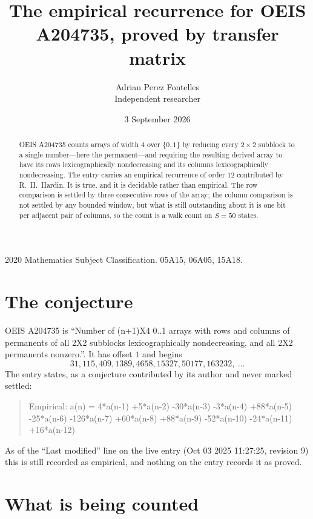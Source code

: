 \documentclass[11pt,a4paper]{article}
\title{The empirical recurrence for OEIS A204735, proved by transfer matrix}
\author{Adrian Perez Fontelles\\ \small Independent researcher}
\date{3 September 2026}
\theoremstyle{plain}
\theoremstyle{definition}
\begin{document}
\maketitle

\begin{abstract}
OEIS A204735 counts arrays of width $4$ over $\{0,1\}$ by reducing every $2\times2$ subblock to a
single number---here the permanent---and requiring the resulting derived array to have its rows
lexicographically nondecreasing and its columns lexicographically nondecreasing. The entry carries an
empirical recurrence of order $12$ contributed by R.~H.~Hardin. It is true, and it is
decidable rather than empirical. The row comparison is settled by three consecutive rows of the
array; the column comparison is not settled by any bounded window, but what is still outstanding
about it is one bit per adjacent pair of columns, so the count is a walk count on $S=50$
states.
\end{abstract}

\noindent\small 2020 Mathematics Subject Classification. 05A15, 06A05, 15A18.\normalsize

\section{The conjecture}

OEIS A204735 is ``Number of (n+1)X4 0..1 arrays with rows and columns of permanents of all 2X2 subblocks lexicographically nondecreasing, and all 2X2 permanents nonzero.''. It has offset $1$ and begins
\[
31, 115, 409, 1389, 4658, 15327, 50177, 163232,\ \dots
\]
The entry states, as a conjecture contributed by its author and never marked settled:
\begin{quote}
Empirical: a(n) = 4*a(n-1) +5*a(n-2) -30*a(n-3) -3*a(n-4) +88*a(n-5) -25*a(n-6) -126*a(n-7) +60*a(n-8) +88*a(n-9) -52*a(n-10) -24*a(n-11) +16*a(n-12)
\end{quote}
As of the ``Last modified'' line on the live entry (Oct 03 2025 11:27:25, revision 9) this is still
recorded as empirical, and nothing on the entry records it as proved.

\section{What is being counted}
\end{document}
